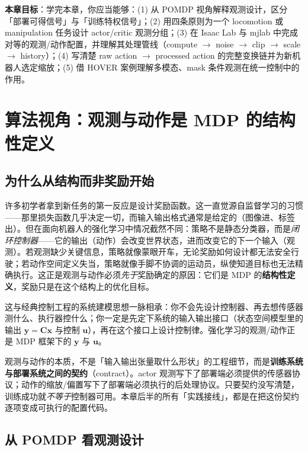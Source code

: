 \textbf{本章目标}：学完本章，你应当能够：(1) 从 POMDP 视角解释观测设计，区分「部署可得信号」与「训练特权信号」；(2) 用四条原则为一个 locomotion 或 manipulation 任务设计 actor/critic 观测分组；(3) 在 Isaac Lab 与 mjlab 中完成对等的观测/动作配置，并理解其处理管线（compute $\to$ noise $\to$ clip $\to$ scale $\to$ history）；(4) 写清楚 raw action $\to$ processed action 的完整变换链并为新机器人选定缩放；(5) 借 HOVER 案例理解多模态、mask 条件观测在统一控制中的作用。

\section{算法视角：观测与动作是 MDP 的结构性定义}
\label{sec:rlmc-obs-mdp}

\subsection{为什么从结构而非奖励开始}

许多初学者拿到新任务的第一反应是设计奖励函数。这一直觉源自监督学习的习惯——那里损失函数几乎决定一切，而输入输出格式通常是给定的（图像进、标签出）。但在面向机器人的强化学习中情况截然不同：策略不是静态分类器，而是\emph{闭环控制器}——它的输出（动作）会改变世界状态，进而改变它的下一个输入（观测）。若观测缺少关键信息，策略就像蒙眼开车，无论奖励如何设计都无法安全行驶；若动作空间定义失当，策略就像手脚不协调的运动员，纵使知道目标也无法精确执行。这正是观测与动作必须\emph{先于}奖励确定的原因：它们是 MDP 的\textbf{结构性定义}，奖励只是在这个结构上的优化目标。

这与经典控制工程的系统建模思想一脉相承：你不会先设计控制器、再去想传感器测什么、执行器控什么；你一定是先定下系统的输入输出接口（状态空间模型里的输出 $\mathbf y=\mathbf C\mathbf x$ 与控制 $\mathbf u$），再在这个接口上设计控制律。强化学习的观测/动作正是 MDP 框架下的 $\mathbf y$ 与 $\mathbf u$。

\begin{insight}\label{ins:rlmc-contract}
观测与动作的本质，不是「输入输出张量取什么形状」的工程细节，而是\textbf{训练系统与部署系统之间的契约}（contract）。actor 观测写下了部署端必须提供的传感器协议；动作的缩放/偏置写下了部署端必须执行的后处理协议。只要契约没写清楚，训练成功就\emph{不等于}控制器可用。本章后半的所有「实践接线」，都是在把这份契约逐项变成可执行的配置代码。
\end{insight}

\subsection{从 POMDP 看观测设计}
\label{sec:rlmc-pomdp}

